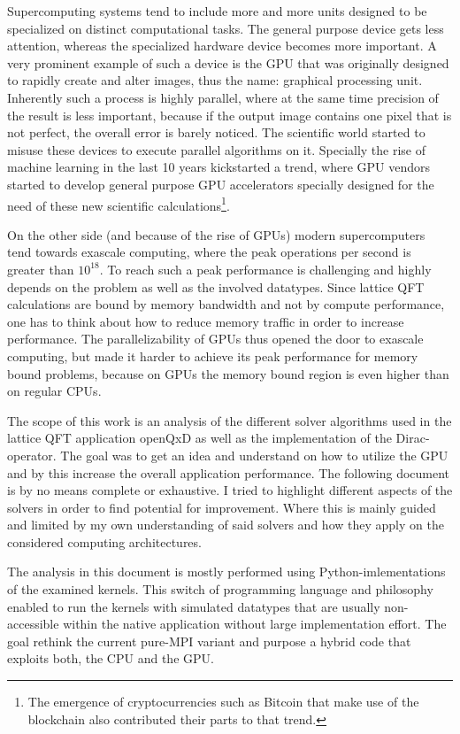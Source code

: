 \documentclass{article}
\theoremstyle{plain} %
\theoremstyle{convention} %
\theoremstyle{remark} %
\numberwithin{equation}{section}
\begin{document}
Supercomputing systems tend to include more and more units designed to be specialized on distinct computational tasks. The general purpose device gets less attention, whereas the specialized hardware device becomes more important. A very prominent example of such a device is the GPU that was originally designed to rapidly create and alter images, thus the name: graphical processing unit. Inherently such a process is highly parallel, where at the same time precision of the result is less important, because if the output image contains one pixel that is not perfect, the overall error is barely noticed. The scientific world started to misuse these devices to execute parallel algorithms on it. Specially the rise of machine learning in the last \num{10} years kickstarted a trend, where GPU vendors started to develop general purpose GPU accelerators specially designed for the need of these new scientific calculations\footnote{The emergence of cryptocurrencies such as Bitcoin that make use of the blockchain also contributed their parts to that trend.}.

On the other side (and because of the rise of GPUs) modern supercomputers tend towards exascale computing, where the peak operations per second is greater than $10^{18}$. To reach such a peak performance is challenging and highly depends on the problem as well as the involved datatypes. Since lattice QFT calculations are bound by memory bandwidth and not by compute performance, one has to think about how to reduce memory traffic in order to increase performance. The parallelizability of GPUs thus opened the door to exascale computing, but made it harder to achieve its peak performance for memory bound problems, because on GPUs the memory bound region is even higher than on regular CPUs.

The scope of this work is an analysis of the different solver algorithms used in the lattice QFT application openQxD as well as the implementation of the Dirac-operator. The goal was to get an idea and understand on how to utilize the GPU and by this increase the overall application performance. The following document is by no means complete or exhaustive. I tried to highlight different aspects of the solvers in order to find potential for improvement. Where this is mainly guided and limited by my own understanding of said solvers and how they apply on the considered computing architectures.

The analysis in this document is mostly performed using Python-imlementations of the examined kernels. This switch of programming language and philosophy enabled to run the kernels with simulated datatypes that are usually non-accessible within the native application without large implementation effort. The goal rethink the current pure-MPI variant and purpose a hybrid code that exploits both, the CPU and the GPU. 
\end{document}
